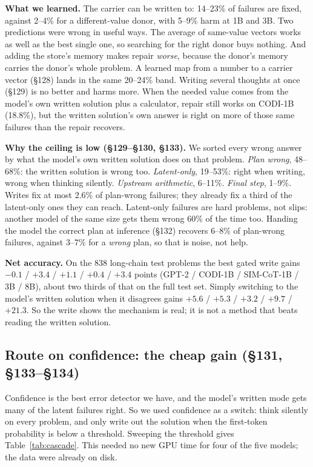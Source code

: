 \documentclass{article}
\begin{document}
\textbf{What we learned.} The carrier can be written to: 14--23\% of failures are fixed, against 2--4\% for a different-value donor, with 5--9\% harm at 1B and 3B. Two predictions were wrong in useful ways. The average of same-value vectors works as well as the best single one, so searching for the right donor buys nothing. And adding the store's memory makes repair \emph{worse}, because the donor's memory carries the donor's whole problem. A learned map from a number to a carrier vector (\S128) lands in the same 20--24\% band. Writing several thoughts at once (\S129) is no better and harms more. When the needed value comes from the model's own written solution plus a calculator, repair still works on CODI-1B (18.8\%), but the written solution's own answer is right on more of those same failures than the repair recovers.

\textbf{Why the ceiling is low (\S129--\S130, \S133).} We sorted every wrong answer by what the model's own written solution does on that problem. \emph{Plan wrong}, 48--68\%: the written solution is wrong too. \emph{Latent-only}, 19--53\%: right when writing, wrong when thinking silently. \emph{Upstream arithmetic}, 6--11\%. \emph{Final step}, 1--9\%. Writes fix at most 2.6\% of plan-wrong failures; they already fix a third of the latent-only ones they can reach. Latent-only failures are hard problems, not slips: another model of the same size gets them wrong 60\% of the time too. Handing the model the correct plan at inference (\S132) recovers 6--8\% of plan-wrong failures, against 3--7\% for a \emph{wrong} plan, so that is noise, not help.

\textbf{Net accuracy.} On the 838 long-chain test problems the best gated write gains $-0.1$ / $+3.4$ / $+1.1$ / $+0.4$ / $+3.4$ points (GPT-2 / CODI-1B / SIM-CoT-1B / 3B / 8B), about two thirds of that on the full test set. Simply switching to the model's written solution when it disagrees gains $+5.6$ / $+5.3$ / $+3.2$ / $+9.7$ / $+21.3$. So the write shows the mechanism is real; it is not a method that beats reading the written solution.

\subsection{Route on confidence: the cheap gain (\S131, \S133--\S134)}

Confidence is the best error detector we have, and the model's written mode gets many of the latent failures right. So we used confidence as a switch: think silently on every problem, and only write out the solution when the first-token probability is below a threshold. Sweeping the threshold gives Table~\ref{tab:cascade}. This needed no new GPU time for four of the five models; the data were already on disk.
\end{document}
